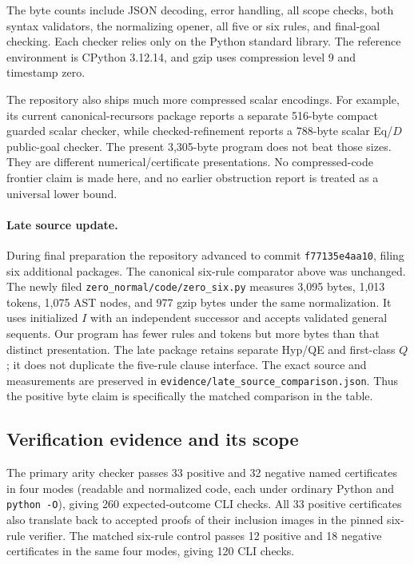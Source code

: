 \documentclass[11pt,letterpaper]{article}
\theoremstyle{definition}\newtheorem{definition}[theorem]{Definition}
\newcommand{\file}[1]{\texttt{\small\nolinkurl{#1}}}
\begin{document}
The byte counts include JSON decoding, error handling, all scope checks, both syntax validators, the normalizing opener, all five or six rules, and final-goal checking. Each checker relies only on the Python standard library. The reference environment is CPython 3.12.14, and gzip uses compression level 9 and timestamp zero.

The repository also ships much more compressed scalar encodings. For example, its current canonical-recursors package reports a separate 516-byte compact guarded scalar checker, while checked-refinement reports a 788-byte scalar Eq/$D$ public-goal checker. The present 3,305-byte program does not beat those sizes. They are different numerical/certificate presentations. No compressed-code frontier claim is made here, and no earlier obstruction report is treated as a universal lower bound.

\paragraph{Late source update.}
During final preparation the repository advanced to commit
\texttt{f77135e4aa10}, filing six additional packages. The canonical
six-rule comparator above was unchanged. The newly filed
\file{zero_normal/code/zero_six.py} measures 3,095 bytes, 1,013 tokens,
1,075 AST nodes, and 977 gzip bytes under the same normalization. It uses
initialized $I$ with an independent successor and accepts validated
general sequents. Our program has fewer rules and tokens but more bytes
than that distinct presentation. The late package retains separate Hyp/QE
and first-class $Q$; it does not duplicate the five-rule clause interface.
The exact source and measurements are preserved in
\file{evidence/late_source_comparison.json}. Thus the positive byte claim
is specifically the matched comparison in the table.

\subsection{Verification evidence and its scope}
The primary arity checker passes 33 positive and 32 negative named
certificates in four modes (readable and normalized code, each under
ordinary Python and \file{python -O}), giving 260 expected-outcome CLI
checks. All 33 positive certificates also translate back to accepted
proofs of their inclusion images in the pinned six-rule verifier.
The matched six-rule control passes 12 positive and 18 negative
certificates in the same four modes, giving 120 CLI checks.
\end{document}
